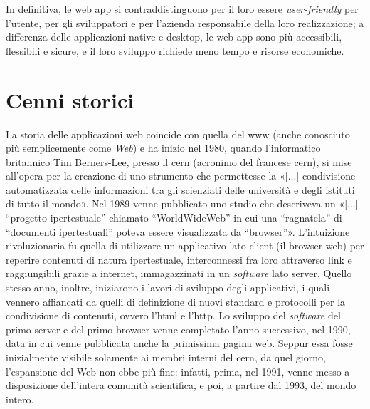 In definitiva, le web app si contraddistinguono per il loro essere \textit{user-friendly} per l'utente, per gli sviluppatori e per l'azienda responsabile della loro realizzazione; a differenza delle applicazioni native e desktop, le web app sono più accessibili, flessibili e sicure, e il loro sviluppo richiede meno tempo e risorse economiche.

\section{Cenni storici}
La storia delle applicazioni web coincide con quella del \gls{www} (anche conosciuto più semplicemente come \textit{Web}) e ha inizio nel 1980, quando l'informatico britannico Tim Berners-Lee, presso il \acrshort{cern} (acronimo del francese \acrlong{cern}), si mise all'opera per la creazione di uno strumento che permettesse la «[...] condivisione automatizzata delle informazioni tra gli scienziati delle università e degli istituti di tutto il mondo»\cite{CERN_ShortHistoryWeb}. Nel 1989 venne pubblicato uno studio che descriveva un «[...] “progetto ipertestuale” chiamato “WorldWideWeb” in cui una “ragnatela” di “documenti ipertestuali” poteva essere visualizzata da “browser”»\cite{CERN_ShortHistoryWeb}. L'intuizione rivoluzionaria fu quella di utilizzare un applicativo lato client (il browser web) per reperire contenuti di natura ipertestuale, interconnessi fra loro attraverso link e raggiungibili grazie a internet, immagazzinati in un \textit{software} lato server. Quello stesso anno, inoltre, iniziarono i lavori di sviluppo degli applicativi, i quali vennero affiancati da quelli di definizione di nuovi standard e protocolli per la condivisione di contenuti, ovvero l'\gls{html} e l'\gls{http}. Lo sviluppo del \textit{software} del primo server e del primo browser venne completato l'anno successivo, nel 1990, data in cui venne pubblicata anche la primissima pagina web. Seppur essa fosse inizialmente visibile solamente ai membri interni del \acrshort{cern}, da quel giorno, l'espansione del Web non ebbe più fine: infatti, prima, nel 1991, venne messo a disposizione dell'intera comunità scientifica, e poi, a partire dal 1993, del mondo intero.

